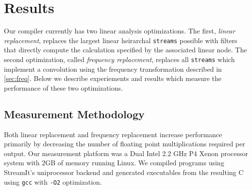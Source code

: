 \section{Results}
\label{sec:results}

Our compiler currently has two linear analysis optimizations. The first,
{\it linear replacement}, replaces the largest linear heirarchal {\tt streams} 
possible with filters that directly compute the calculation specified by 
the associated linear node. The second optimization, called 
{\it frequency replacement}, replaces all {\tt streams} which implement 
a convolution using the frequency transformation described in 
\ref{sec:freq}. Below we describe experiements and results which measure the
performance of these two optimizations.



\subsection{Measurement Methodology}



Both linear replacement and frequency replacement increase performance primarily by 
decreasing the number of floating point multiplications required per output.
Our measurement platform was a Dual Intel 2.2 GHz P4 Xenon processor system 
with 2GB of memory running Linux. We compiled programs using StreamIt's uniprocessor backend
and generated executables from the resulting C using {\tt gcc} with {\tt -O2} optimization.

